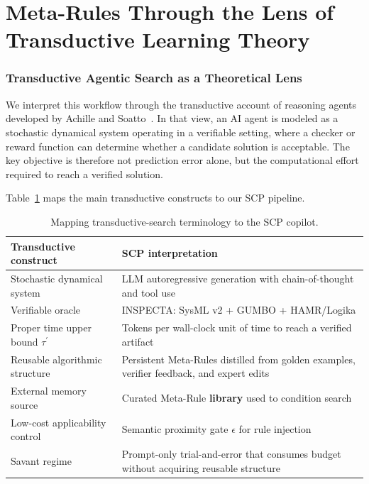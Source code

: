 \documentclass[conference]{IEEEtran}
\begin{document}
\section{Meta-Rules Through the Lens of Transductive Learning Theory}
\label{app:transductive}
\subsubsection{Transductive Agentic Search as a Theoretical Lens}

We interpret this workflow through the transductive account of reasoning agents developed by Achille and Soatto~\cite{e28030332}. In that view, an AI agent is modeled as a stochastic dynamical system operating in a verifiable setting, where a checker or reward function can determine whether a candidate solution is acceptable. The key objective is therefore not prediction error alone, but the computational effort required to reach a verified solution.

Table~\ref{tab:transductive-map} maps the main transductive constructs to our SCP pipeline.

\begin{table}[t]
\caption{Mapping transductive-search terminology to the SCP copilot.}
\label{tab:transductive-map}
\centering
\footnotesize
\begin{tabular}{p{3.0cm} p{4.6cm}}
\hline
\textbf{Transductive construct} & \textbf{SCP interpretation} \\
\hline
Stochastic dynamical system & LLM autoregressive generation with chain-of-thought and tool use \\
Verifiable oracle & INSPECTA: SysML v2 + GUMBO + HAMR/Logika \\
Proper time upper bound $\tau^{'}$ & Tokens per wall-clock unit of time to reach a verified artifact \\
Reusable algorithmic structure & Persistent Meta-Rules distilled from golden examples, verifier feedback, and expert edits \\
External memory source & Curated Meta-Rule \textbf{library} used to condition search \\
Low-cost applicability control & Semantic proximity gate $\epsilon$ for rule injection \\
Savant regime & Prompt-only trial-and-error that consumes budget without acquiring reusable structure \\
\hline
\end{tabular}
\end{table}
\end{document}
